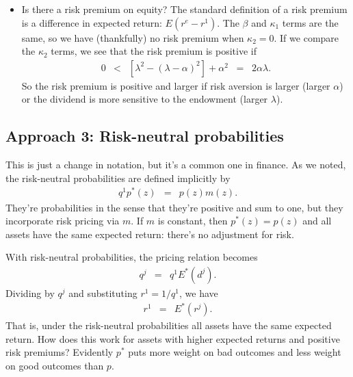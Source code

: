\documentclass[11pt]{article}
\begin{document}
\begin{itemize}
\item Is there a risk premium on equity?
The standard definition of a risk premium is a difference in expected return:  $E(r^e-r^1)$.
The $\beta$ and $\kappa_1$ terms are the same, so we have (thankfully)
no risk premium when $\kappa_2 = 0$.
If we compare the $\kappa_2$ terms, we see that the risk premium is positive if
\begin{eqnarray*}
    0 &<& [\lambda^2 - (\lambda-\alpha)^2] + \alpha^2 \;\;=\;\; 2 \alpha \lambda .
\end{eqnarray*}
So the risk premium is positive and larger if risk aversion is larger (larger $\alpha$)
or the dividend is more sensitive to the endowment (larger $\lambda$).


\end{itemize}



\subsection*{Approach 3:  Risk-neutral probabilities}

This is just a change in notation, but it's a common one in finance.
As we noted, the risk-neutral probabilities are defined implicitly by
\begin{eqnarray*}
    q^1 p^*(z) &=& p(z) m(z) .
\end{eqnarray*}
They're probabilities in the sense that they're positive and sum to one,
but they incorporate risk pricing via $m$.
If $m$ is constant, then $p^*(z) = p(z)$
and all assets have the same expected return:  there's no adjustment for risk.

With risk-neutral probabilities,
the pricing relation becomes
\begin{eqnarray*}
    q^j &=& q^1 E^* (d^j).
\end{eqnarray*}
Dividing by $q^j$ and substituting $r^1 = 1/q^1$, we have
\begin{eqnarray*}
    r^1 &=& E^* (r^j).
\end{eqnarray*}
That is, under the risk-neutral probabilities all assets have the same expected return.
How does this work for assets with higher expected returns and positive risk premiums?
Evidently $p^*$ puts more weight on bad outcomes and less weight on good outcomes than $p$.
\end{document}
